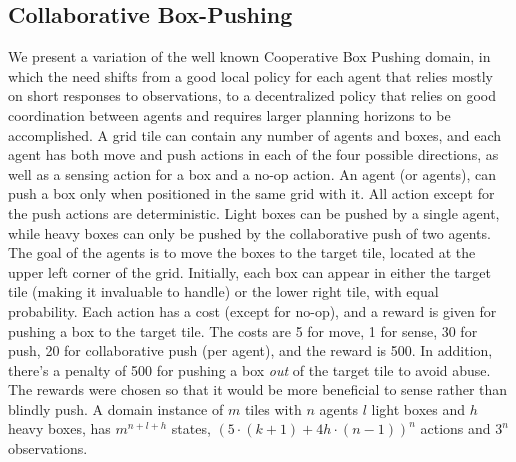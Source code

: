 \documentclass[letterpaper]{article} %
\theoremstyle{definition}
\newcommand{\cbp}[0]{Collaborative Box-Pushing}
\begin{document}
\subsection{\cbp}
We present a variation of the well known Cooperative Box Pushing domain, in which the need shifts from a good local policy for each agent that relies mostly on short responses to observations, to a decentralized policy that relies on good coordination between agents and requires larger planning horizons to be accomplished. A grid tile can contain any number of agents and boxes, and each agent has both move and push actions in each of the four possible directions, as well as a sensing action for a box and a no-op action.
An agent (or agents), can push a box only when positioned in the same grid with it.
All action except for the push actions are deterministic.
Light boxes can be pushed by a single agent, while heavy boxes can only be pushed by the collaborative push of two agents.
The goal of the agents is to move the boxes to the target tile, located at the upper left corner of the grid.
Initially, each box can appear in either the target tile (making it invaluable to handle) or the lower right tile, with equal probability.
Each action has a cost (except for no-op), and a reward is given for pushing a box to the target tile. The costs are 5 for move, 1 for sense, 30 for push, 20 for collaborative push (per agent), and the reward is 500. In addition, there's a penalty of 500 for pushing a box \emph{out} of the target tile to avoid abuse.
The rewards were chosen so that it would be more beneficial to sense rather than blindly push.
A domain instance of $m$ tiles with $n$ agents $l$ light boxes and $h$ heavy boxes, has $m^{n+l+h}$ states, $(5\cdot(k+1)+4h\cdot(n-1))^n$ actions and $3^n$ observations. 
\end{document}
